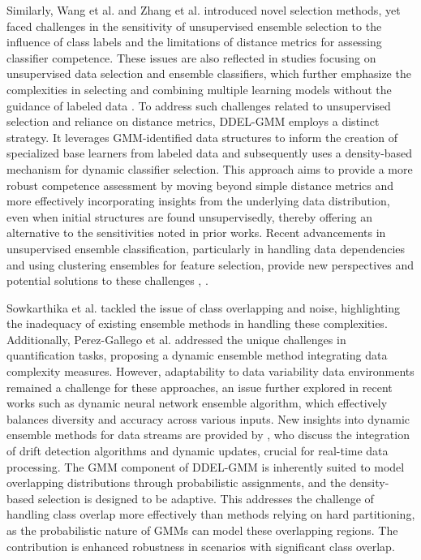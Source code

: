 \documentclass[lettersize,journal]{IEEEtran}
\newcommand{\greenhighlight}[1]{\textcolor{highlightgreen}{#1}}
\begin{document}
Similarly, Wang et al. \cite{wang_ensemble_2021} and Zhang et al. \cite{zhang_distance-based_2019} introduced novel selection methods, yet faced challenges in the sensitivity of unsupervised ensemble selection to the influence of class labels and the limitations of distance metrics for assessing classifier competence. These issues are also reflected in studies focusing on unsupervised data selection and ensemble classifiers, which further emphasize the complexities in selecting and combining multiple learning models without the guidance of labeled data \cite{huang_ensemble_2016}. \greenhighlight{To address such challenges related to unsupervised selection and reliance on distance metrics, DDEL-GMM employs a distinct strategy. It leverages GMM-identified data structures to inform the creation of specialized base learners from labeled data and subsequently uses a density-based mechanism for dynamic classifier selection. This approach aims to provide a more robust competence assessment by moving beyond simple distance metrics and more effectively incorporating insights from the underlying data distribution, even when initial structures are found unsupervisedly, thereby offering an alternative to the sensitivities noted in prior works.} Recent advancements in unsupervised ensemble classification, particularly in handling data dependencies and using clustering ensembles for feature selection, provide new perspectives and potential solutions to these challenges \cite{tian_improved_2022}, \cite{traganitis_unsupervised_2022, ayerdi_spatially_2015}.

Sowkarthika et al. \cite{b_data_2023} tackled the issue of class overlapping and noise, highlighting the inadequacy of existing ensemble methods in handling these complexities. Additionally, Perez-Gallego et al. \cite{perez-gallego_dynamic_2019} addressed the unique challenges in quantification tasks, proposing a dynamic ensemble method integrating data complexity measures. However, adaptability to data variability data environments remained a challenge for these approaches, an issue further explored in recent works such as \cite{alam_dynamic_2020} dynamic neural network ensemble algorithm, which effectively balances diversity and accuracy across various inputs. New insights into dynamic ensemble methods for data streams are provided by \cite{gomes_survey_2017}, who discuss the integration of drift detection algorithms and dynamic updates, crucial for real-time data processing. \greenhighlight{The GMM component of DDEL-GMM is inherently suited to model overlapping distributions through probabilistic assignments, and the density-based selection is designed to be adaptive. This addresses the challenge of handling class overlap more effectively than methods relying on hard partitioning, as the probabilistic nature of GMMs can model these overlapping regions. The contribution is enhanced robustness in scenarios with significant class overlap.}
\end{document}
